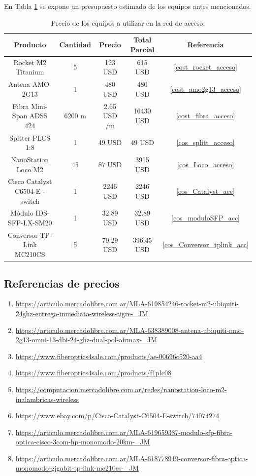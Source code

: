 \documentclass[12pt,a4paper]{book}
\begin{document}
En Tabla \ref{tabla_preciosEquipos} se expone un presupuesto estimado de los equipos antes mencionados.

\begin{table} [H]
\centering
\begin{tabular}{|c|c|c|c|c|}
\hline 
Producto & Cantidad & Precio & Total Parcial & Referencia \\ 
\hline 
Rocket M2 Titanium & 5 & 123 USD & 615 USD & \ref{cost_rocket_acceso}\\ 
\hline 
 Antena AMO-2G13 & 1 & 480 USD & 480 USD & \ref{cost_amo2g13_acceso}\\ 
\hline 
Fibra Mini-Span ADSS 424 & 6200 m & 2.65 USD /m & 16430 USD & \ref{cost_fibra_acceso}\\ 
\hline 
Spltter PLCS 1:8 &1 & 49 USD & 49 USD & \ref{cos_splitt_acceso}\\ 
\hline
NanoStation Loco M2 &  45 & 87 USD & 3915 USD & \ref{cos_Loco_acceso}\\
\hline
Cisco Catalyst C6504-E - switch & 1 & 2246 USD & 2246 USD & \ref{cos_Catalyst_acc} \\
\hline
Módulo IDS-SFP-LX-SM20 & 1 & 32.89 USD & 32.89 USD& \ref{cos_moduloSFP_acc}\\
\hline
Conversor TP-Link MC210CS & 5 & 79.29 USD & 396.45 USD & \ref{cos_Conversor_tplink_acc}\\
\hline


\end{tabular} 
\caption{Precio de los equipos a utilizar en la red de acceso.}
\label{tabla_preciosEquipos}
\end{table}

\subsection{Referencias de precios}
\begin{enumerate}
\item \label{cost_rocket_acceso} 
\url{ https://articulo.mercadolibre.com.ar/MLA-619854246-rocket-m2-ubiquiti-
24ghz-entrega-inmediata-wireless-tigre-_JM}
\item \label{cost_amo2g13_acceso}
\url{ https://articulo.mercadolibre.com.ar/MLA-638389008-antena-ubiquiti-amo-
2g13-omni-13-dbi-24-ghz-dual-pol-airmax-_JM}
\item  \label{cost_fibra_acceso}
\url{ https://www.fiberoptics4sale.com/products/ae-00696c520-aa4}
\item  \label{cos_splitt_acceso}
\url{ https://www.fiberoptics4sale.com/products/f1plc08}
\item \label{cos_Loco_acceso}
\url{ https://computacion.mercadolibre.com.ar/redes/nanostation-loco-m2-inalambricas-wireless}
\item \label{cos_Catalyst_acc}
\url{ https://www.ebay.com/p/Cisco-Catalyst-C6504-E-switch/74074274}
\item \label{cos_moduloSFP_acc}
\url{ https://articulo.mercadolibre.com.ar/MLA-619659387-modulo-sfp-fibra-optica-cisco-3com-hp-monomodo-20km-_JM}
\item \label{cos_Conversor_tplink_acc}
\url{ https://articulo.mercadolibre.com.ar/MLA-618778919-conversor-fibra-optica-monomodo-gigabit-tp-link-mc210cs-_JM}
\end{enumerate}
\end{document}
